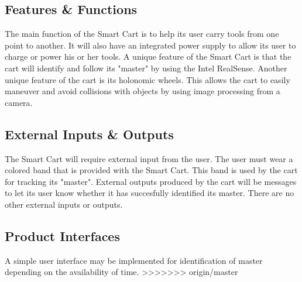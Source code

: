 \subsection{Features \& Functions}
The main function of the Smart Cart is to help its user carry tools from one point to another. It will also have an integrated power supply to allow its user to charge or power his or her tools. A unique feature of the Smart Cart is that the cart will identify and follow its "master" by using the Intel RealSense. Another unique feature of the cart is its holonomic wheels. This allows the cart to easily maneuver and avoid collisions with objects by using image processing from a camera. 

\subsection{External Inputs \& Outputs}
The Smart Cart will require external input from the user. The user must wear a colored band that is provided with the Smart Cart. This band is used by the cart for tracking its "master". External outputs produced by the cart will be messages to let its user know whether it has succesfully identified its master. There are no other external inputs or outputs.

\subsection{Product Interfaces}
A simple user interface may be implemented for identification of master depending on the availability of time. 
>>>>>>> origin/master

